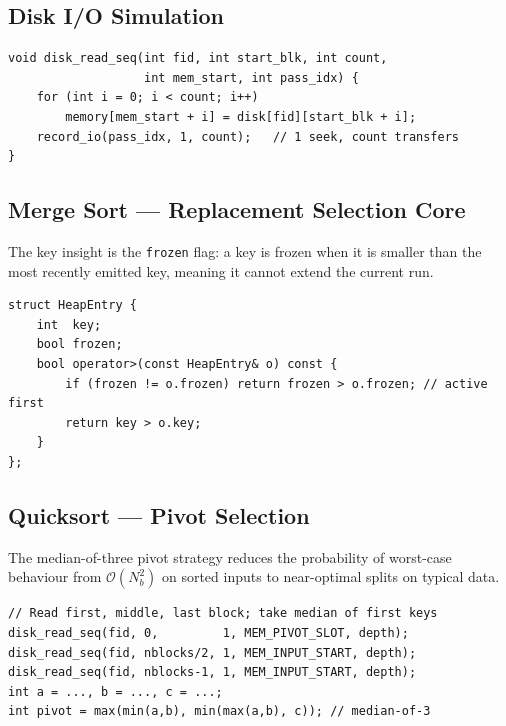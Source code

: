\documentclass[12pt,a4paper]{article}
\newcommand{\bigO}[1]{\mathcal{O}\!\left(#1\right)}
\begin{document}
\subsection{Disk I/O Simulation}

\begin{lstlisting}[caption={Sequential block read (1 seek + count transfers)}]
void disk_read_seq(int fid, int start_blk, int count,
                   int mem_start, int pass_idx) {
    for (int i = 0; i < count; i++)
        memory[mem_start + i] = disk[fid][start_blk + i];
    record_io(pass_idx, 1, count);   // 1 seek, count transfers
}
\end{lstlisting}

\subsection{Merge Sort — Replacement Selection Core}

The key insight is the \texttt{frozen} flag: a key is frozen when it is smaller
than the most recently emitted key, meaning it cannot extend the current run.

\begin{lstlisting}[caption={Heap entry with frozen flag}]
struct HeapEntry {
    int  key;
    bool frozen;
    bool operator>(const HeapEntry& o) const {
        if (frozen != o.frozen) return frozen > o.frozen; // active first
        return key > o.key;
    }
};
\end{lstlisting}

\subsection{Quicksort — Pivot Selection}

The median-of-three pivot strategy reduces the probability of worst-case
behaviour from $\bigO{N_b^2}$ on sorted inputs to near-optimal splits on
typical data.

\begin{lstlisting}[caption={Median-of-3 pivot selection}]
// Read first, middle, last block; take median of first keys
disk_read_seq(fid, 0,         1, MEM_PIVOT_SLOT, depth);
disk_read_seq(fid, nblocks/2, 1, MEM_INPUT_START, depth);
disk_read_seq(fid, nblocks-1, 1, MEM_INPUT_START, depth);
int a = ..., b = ..., c = ...;
int pivot = max(min(a,b), min(max(a,b), c)); // median-of-3
\end{lstlisting}

\end{document}

